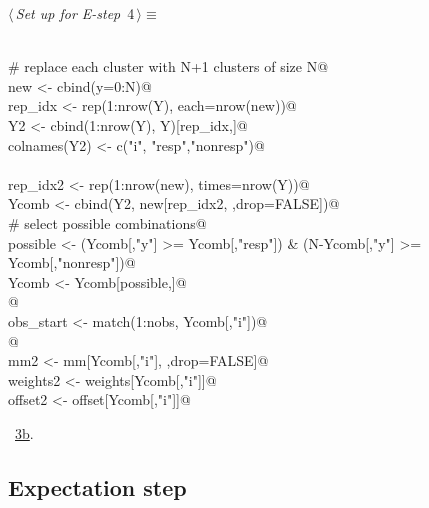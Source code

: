 \documentclass[reqno]{amsart}
\renewcommand{\NWtarget}[2]{\hypertarget{#1}{#2}}
\renewcommand{\NWlink}[2]{\hyperlink{#1}{#2}}
\begin{document}
\begin{flushleft} \small\label{scrap5}\raggedright\small
\NWtarget{nuweb4}{} $\langle\,${\itshape Set up for E-step}\nobreak\ {\footnotesize {4}}$\,\rangle\equiv$
\vspace{-1ex}
\begin{list}{}{} \item
\mbox{}\verb@@\\
\mbox{}\verb@  # replace each cluster with N+1 clusters of size N@\\
\mbox{}\verb@  new <- cbind(y=0:N)@\\
\mbox{}\verb@  rep_idx <- rep(1:nrow(Y), each=nrow(new))@\\
\mbox{}\verb@  Y2 <- cbind(1:nrow(Y), Y)[rep_idx,]@\\
\mbox{}\verb@  colnames(Y2) <- c("i", "resp","nonresp")@\\
\mbox{}\verb@@\\
\mbox{}\verb@  rep_idx2 <- rep(1:nrow(new), times=nrow(Y))@\\
\mbox{}\verb@  Ycomb <- cbind(Y2, new[rep_idx2, ,drop=FALSE])@\\
\mbox{}\verb@  # select possible combinations@\\
\mbox{}\verb@  possible <- (Ycomb[,"y"] >= Ycomb[,"resp"]) & (N-Ycomb[,"y"] >= Ycomb[,"nonresp"])@\\
\mbox{}\verb@  Ycomb <- Ycomb[possible,]@\\
\mbox{}\verb@  @\\
\mbox{}\verb@  obs_start <- match(1:nobs, Ycomb[,"i"])@\\
\mbox{}\verb@ @\\
\mbox{}\verb@  mm2 <- mm[Ycomb[,"i"], ,drop=FALSE]@\\
\mbox{}\verb@  weights2 <- weights[Ycomb[,"i"]]@\\
\mbox{}\verb@  offset2 <- offset[Ycomb[,"i"]]@\\
\mbox{}\verb@@{\NWsep}
\end{list}
\vspace{-1.5ex}
\footnotesize
\begin{list}{}{\setlength{\itemsep}{-\parsep}\setlength{\itemindent}{-\leftmargin}}
\item \NWtxtMacroRefIn\ \NWlink{nuweb3b}{3b}.

\item{}
\end{list}
\vspace{4ex}
\end{flushleft}
\subsection{Expectation step}
\end{document}
